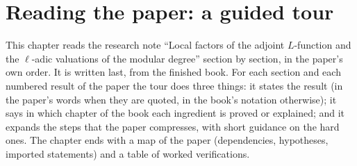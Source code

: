 \chapter{Reading the paper: a guided tour}\label{ch:paper}

This chapter reads the research note ``Local factors of the adjoint $L$-function and the $\ell$-adic valuations of the modular degree'' section by
section, in the paper's own order. It is written last, from the finished book. For each section and each numbered result of the paper the tour does three
things: it states the result (in the paper's words when they are quoted, in the book's notation otherwise); it says in which chapter of the book each
ingredient is proved or explained; and it expands the steps that the paper compresses, with short guidance on the hard ones. The chapter ends with a map
of the paper (dependencies, hypotheses, imported statements) and a table of worked verifications.

